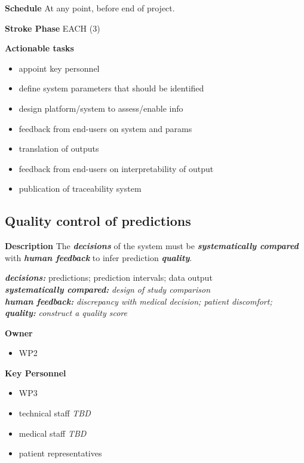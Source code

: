 \documentclass[
  letterpaper,
  DIV=11,
  numbers=noendperiod]{scrreport}
\providecommand{\tightlist}{%
  \setlength{\itemsep}{0pt}\setlength{\parskip}{0pt}}\usepackage{longtable,booktabs,array}
\begin{document}
\textbf{Schedule} At any point, before end of project.

\textbf{Stroke Phase} EACH (3)

\textbf{Actionable tasks}

\begin{itemize}
\tightlist
\item
  appoint key personnel
\item
  define system parameters that should be identified
\item
  design platform/system to assess/enable info
\item
  feedback from end-users on system and params
\item
  translation of outputs
\item
  feedback from end-users on interpretability of output
\item
  publication of traceability system
\end{itemize}

\hypertarget{quality-control-of-predictions}{%
\subsection{Quality control of
predictions}\label{quality-control-of-predictions}}

\textbf{Description} The \textbf{\emph{decisions}} of the system must be
\textbf{\emph{systematically compared}} with \textbf{\emph{human
feedback}} to infer prediction \textbf{\emph{quality}}.

\textbf{\emph{decisions:}} predictions; prediction intervals; data
output\\
\textbf{\emph{systematically compared:}} \emph{design of study
comparison}\\
\textbf{\emph{human feedback:}} \emph{discrepancy with medical decision;
patient discomfort;}\\
\textbf{\emph{quality:}} \emph{construct a quality score}

\textbf{Owner}

\begin{itemize}
\tightlist
\item
  WP2
\end{itemize}

\textbf{Key Personnel}

\begin{itemize}
\tightlist
\item
  WP3
\item
  technical staff \emph{TBD}
\item
  medical staff \emph{TBD}
\item
  patient representatives
\end{itemize}
\end{document}
